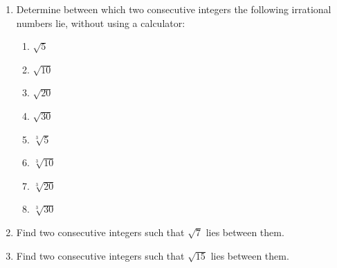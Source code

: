 \begin{eocexercises}{}
\begin{enumerate}[itemsep=5pt, label=\textbf{\arabic*}. ]
\item Determine between which two consecutive integers the following irrational numbers lie, without using a calculator:
\begin{multicols}{2}
    \begin{enumerate}[itemsep=5pt, label=\textbf{(\alph*)} ] 
    \item $\sqrt{5}$ 
    \item $\sqrt{10}$ 
    \item $\sqrt{20}$ 
    \item $\sqrt{30}$ 
    \item $\sqrt[3]{5}$ 
    \item $\sqrt[3]{10}$ 
    \item $\sqrt[3]{20}$ 
    \item $\sqrt[3]{30}$ 
    \end{enumerate}
\end{multicols}

\item  Find two consecutive integers such that $\sqrt{7}$ lies between them.          
\item  Find two consecutive integers such that $\sqrt{15}$ lies between them.          





\end{enumerate}
\end{eocexercises}
